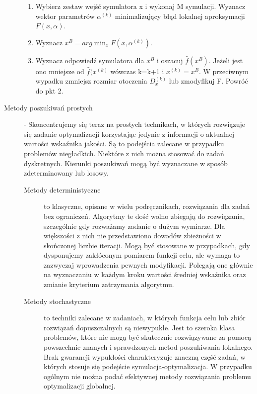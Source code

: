 \begin{description}
    \begin{enumerate}
        \item Wybierz zestaw wejść symulatora x i wykonaj M symulacji. Wyznacz wektor parametrów $\alpha^{(k)}$ minimalizujący błąd lokalnej aproksymacji $F(x,\alpha)$.
        \item Wyznacz $x^B = arg \min_x F(x,\alpha^{(k)})$.
        \item Wyznacz odpowiedź symulatora dla $x^B$ i oszacuj $\hat{f}(x^B)$. Jeżeli jest ono mniejsze od $\hat{f}(x^{(k)}$ wówczas k=k+1 i $x^{(k)} = x^B$. W przeciwnym wypadku zmniejsz rozmiar otoczenia $D_x^{(k)}$ lub zmodyfikuj F. Powróć do pkt 2.
    \end{enumerate}
    \item[Metody poszukiwań prostych] - Skoncentrujemy się teraz na prostych technikach, w których rozwiązuje się zadanie optymalizacji korzystając jedynie z informacji o aktualnej wartości wskaźnika jakości. Są to podejścia zalecane w przypadku problemów niegładkich. Niektóre z nich można stosować do zadań dyskretnych. Kierunki poszukiwań mogą być wyznaczane w sposób zdeterminowany lub losowy.\mbox{}
    \begin{description}
        \item[Metody deterministyczne] to klasyczne, opisane w wielu podręcznikach, rozwiązania dla zadań bez ograniczeń. Algorytmy te dość wolno zbiegają do rozwiązania, szczególnie gdy rozważamy zadanie o dużym wymiarze. Dla większości z nich nie przedstawiono dowodów zbieżności w skończonej liczbie iteracji. Mogą być stosowane w przypadkach, gdy dysponujemy zakłóconym pomiarem funkcji celu, ale wymaga to zazwyczaj wprowadzenia pewnych modyfikacji. Polegają one głównie na wyznaczaniu w każdym kroku wartości średniej wskaźnika oraz zmianie kryterium zatrzymania algorytmu.
        \item[Metody stochastyczne] to techniki zalecane w zadaniach, w których funkcja celu lub zbiór rozwiązań dopuszczalnych są niewypukłe. Jest to szeroka klasa problemów, które nie mogą być skutecznie rozwiązywane za pomocą powszechnie znanych i sprawdzonych metod poszukiwania lokalnego. Brak gwarancji wypukłości charakteryzuje znaczną część zadań, w których stosuje się podejście symulacja-optymalizacja. W przypadku ogólnym nie można podać efektywnej metody rozwiązania problemu optymalizacji globalnej.
        

\end{description}
\end{description}
